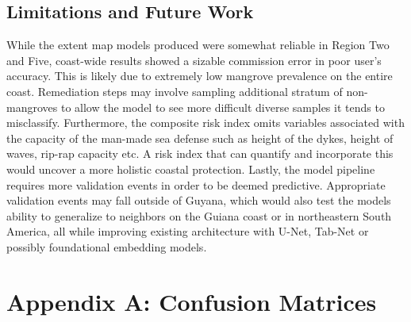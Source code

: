 \documentclass[final-report]{report-template}
\begin{document}
\subsection{Limitations and Future Work}
While the extent map models produced were somewhat reliable in Region Two and Five, coast-wide results showed a sizable commission error in poor user's accuracy. This is likely due to extremely low mangrove prevalence on the entire coast. Remediation steps may involve sampling additional stratum of non-mangroves to allow the model to see more difficult diverse samples it tends to misclassify. Furthermore, the composite risk index omits variables associated with the capacity of the man-made sea defense such as height of the dykes, height of waves, rip-rap capacity etc. A risk index that can quantify and incorporate this would uncover a more holistic coastal protection. Lastly, the model pipeline requires more validation events in order to be deemed predictive. Appropriate validation events may fall outside of Guyana, which would also test the models ability to generalize to neighbors on the Guiana coast or in northeastern South America, all while improving existing architecture with U-Net, Tab-Net or possibly foundational embedding models.

\clearpage
\appendix
\setcounter{table}{0}
\setcounter{figure}{0}
\section{Appendix A: Confusion Matrices} 

\vspace{6 mm}


\clearpage
\end{document}

